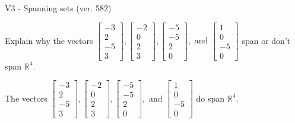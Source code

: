 \begin{exercise}
  \begin{exerciseTitle}V3 - Spanning sets (ver. 582)\end{exerciseTitle}
  \begin{exerciseStatement}
    Explain why the vectors \(\left[\begin{array}{r}
-3 \\
2 \\
-5 \\
3
\end{array}\right] , \left[\begin{array}{r}
-2 \\
0 \\
2 \\
3
\end{array}\right] , \left[\begin{array}{r}
-5 \\
-5 \\
2 \\
0
\end{array}\right] , \text{ and } \left[\begin{array}{r}
1 \\
0 \\
-5 \\
0
\end{array}\right]\) span or don't span \(\mathbb{R}^4\). 
	


  \end{exerciseStatement}
  \begin{exerciseAnswer}
   The vectors \(\left[\begin{array}{r}
-3 \\
2 \\
-5 \\
3
\end{array}\right] , \left[\begin{array}{r}
-2 \\
0 \\
2 \\
3
\end{array}\right] , \left[\begin{array}{r}
-5 \\
-5 \\
2 \\
0
\end{array}\right] , \text{ and } \left[\begin{array}{r}
1 \\
0 \\
-5 \\
0
\end{array}\right]\) 
  	 do  
	span \(\mathbb{R}^4\).
  


  \end{exerciseAnswer}
\end{exercise}